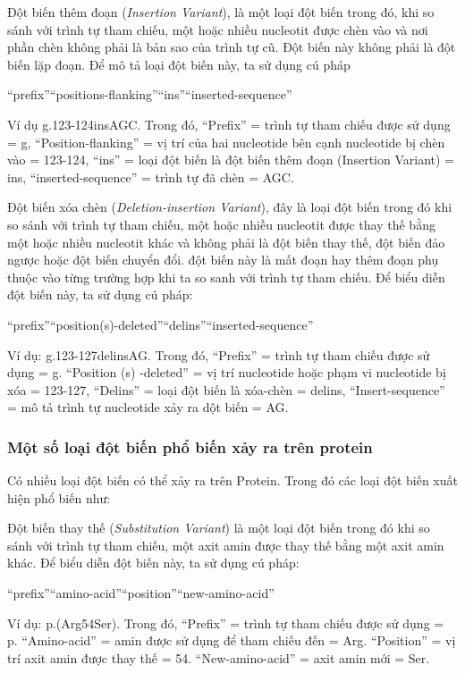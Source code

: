 \documentclass[../DoAn.tex]{subfiles}
\begin{document}
 Đột biến thêm đoạn (\textit{Insertion Variant}), là một loại đột biến trong đó, khi so sánh với trình tự tham chiếu, một hoặc nhiều nucleotit được chèn vào và nơi phần chèn không phải là bản sao của trình tự cũ. Đột biến này không phải là đột biến lặp đoạn. Để mô tả loại đột biến này, ta sử dụng cú pháp 
 \begin{center}“prefix”“positions-flanking”“ins”“inserted-sequence”\end{center} 
 Ví dụ g.123-124insAGC. Trong đó, “Prefix” = trình tự tham chiếu được sử dụng = g, “Position-flanking” = vị trí của hai nucleotide bên cạnh nucleotide bị chèn vào = 123-124, “ins” = loại đột biến là đột biến thêm đoạn (Insertion Variant) = ins, “inserted-sequence” = trình tự đã chèn = AGC.

 Đột biến xóa chèn (\textit{Deletion-insertion Variant}), đây là loại đột biến trong đó khi so sánh với trình tự tham chiếu, một hoặc nhiều nucleotit được thay thế bằng một hoặc nhiều nucleotit khác và không phải là đột biến thay thế, đột biến đảo ngược hoặc đột biến chuyển đổi. đột biến này là mất đoạn hay thêm đoạn phụ thuộc vào từng trường hợp khi ta so sanh với trình tự tham chiếu. Để biểu diễn đột biến này, ta sử dụng cú pháp: 
 \begin{center}“prefix”“position(s)-deleted”“delins”“inserted-sequence”\end{center}
 Ví dụ: g.123-127delinsAG. Trong đó, “Prefix” = trình tự tham chiếu được sử dụng = g. “Position (s) -deleted” = vị trí nucleotide hoặc phạm vi nucleotide bị xóa = 123-127, “Delins” = loại đột biến là xóa-chèn = delins, “Insert-sequence” = mô tả trình tự nucleotide xảy ra dột biến = AG.

\subsubsection{Một số loại đột biến phổ biến xảy ra trên protein}
 Có nhiều loại đột biến có thể xảy ra trên Protein. Trong đó các loại đột biến xuất hiện phổ biến như: 
 
Đột biến thay thế (\textit{Substitution Variant}) là một loại đột biến trong đó khi so sánh với trình tự tham chiếu, một axit amin được thay thế bằng một axit amin khác. Để biểu diễn đột biến này, ta sử dụng cú pháp: 
\begin{center}“prefix”“amino-acid”“position”“new-amino-acid”\end{center}
Ví dụ: p.(Arg54Ser). Trong đó, “Prefix” = trình tự tham chiếu được sử dụng = p. “Amino-acid” = amin được sử dụng để tham chiếu đến = Arg. “Position” = vị trí axit amin được thay thế = 54. “New-amino-acid” = axit amin mới = Ser. 
\end{document}
